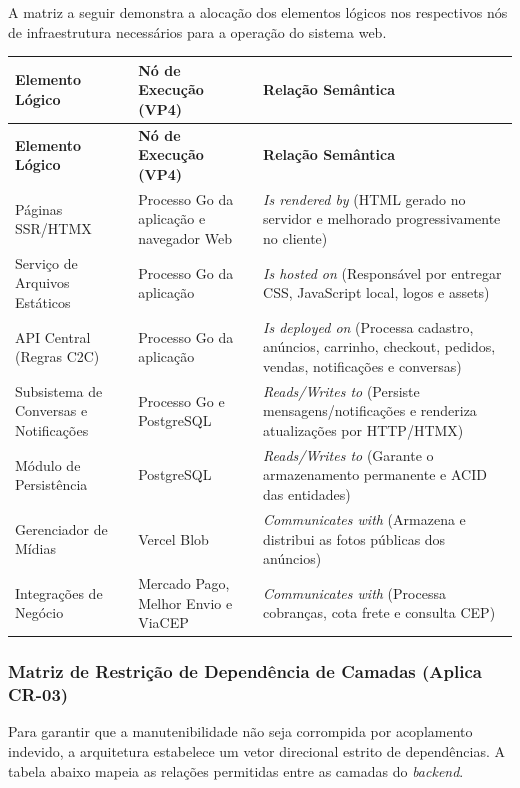 ﻿\documentclass[12pt,a4paper]{article}
\begin{document}
A matriz a seguir demonstra a alocação dos elementos lógicos nos respectivos nós de infraestrutura necessários para a operação do sistema web.

\begin{longtable}{|p{4cm}|p{5cm}|p{5cm}|}
\hline
\textbf{Elemento Lógico} & \textbf{Nó de Execução (VP4)} & \textbf{Relação Semântica} \\
\hline
\endfirsthead
\hline
\textbf{Elemento Lógico} & \textbf{Nó de Execução (VP4)} & \textbf{Relação Semântica} \\
\hline
\endhead
Páginas SSR/HTMX & Processo Go da aplicação e navegador Web & \textit{Is rendered by} (HTML gerado no servidor e melhorado progressivamente no cliente) \\
\hline
Serviço de Arquivos Estáticos & Processo Go da aplicação & \textit{Is hosted on} (Responsável por entregar CSS, JavaScript local, logos e assets) \\
\hline
API Central (Regras C2C) & Processo Go da aplicação & \textit{Is deployed on} (Processa cadastro, anúncios, carrinho, checkout, pedidos, vendas, notificações e conversas) \\
\hline
Subsistema de Conversas e Notificações & Processo Go e PostgreSQL & \textit{Reads/Writes to} (Persiste mensagens/notificações e renderiza atualizações por HTTP/HTMX) \\
\hline
Módulo de Persistência & PostgreSQL & \textit{Reads/Writes to} (Garante o armazenamento permanente e ACID das entidades) \\
\hline
Gerenciador de Mídias & Vercel Blob & \textit{Communicates with} (Armazena e distribui as fotos públicas dos anúncios) \\
\hline
Integrações de Negócio & Mercado Pago, Melhor Envio e ViaCEP & \textit{Communicates with} (Processa cobranças, cota frete e consulta CEP) \\
\hline
\end{longtable}

\subsubsection{Matriz de Restrição de Dependência de Camadas (Aplica CR-03)}

Para garantir que a manutenibilidade não seja corrompida por acoplamento indevido, a arquitetura estabelece um vetor direcional estrito de dependências. A tabela abaixo mapeia as relações permitidas entre as camadas do \textit{backend}.
\end{document}
